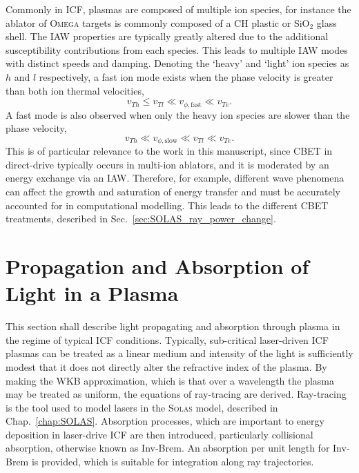 Commonly in \ac{ICF}, plasmas are composed of multiple ion species, for instance the ablator of \textsc{Omega} targets is commonly composed of a CH plastic or SiO$_2$ glass shell.
The \ac{IAW} properties are typically greatly altered due to the additional susceptibility contributions from each species.
This leads to multiple \ac{IAW} modes with distinct speeds and damping.
Denoting the `heavy' and `light' ion species as $h$ and $l$ respectively, a fast ion mode exists when the phase velocity is greater than both ion thermal velocities,
\begin{equation}
    v_{Th} \leq v_{Tl} \ll v_{\phi,\text{fast}} \ll v_{Te}.
\end{equation}
A fast mode is also observed when only the heavy ion species are slower than the phase velocity,
\begin{equation}
    v_{Th} \ll v_{\phi,\text{slow}} \ll v_{Tl}  \ll v_{Te}.
\end{equation}
This is of particular relevance to the work in this manuscript, since \ac{CBET} in direct-drive typically occurs in multi-ion ablators, and it is moderated by an energy exchange via an \ac{IAW}.
Therefore, for example, different wave phenomena can affect the growth and saturation of energy transfer and must be accurately accounted for in computational modelling.
This leads to the different \ac{CBET} treatments, described in Sec.~\ref{sec:SOLAS_ray_power_change}.

\section{Propagation and Absorption of Light in a Plasma}%
\label{sec:theory_propagation}

This section shall describe light propagating and absorption through plasma in the regime of typical \ac{ICF} conditions.
Typically, sub-critical laser-driven \ac{ICF} plasmas can be treated as a linear medium and intensity of the light is sufficiently modest that it does not directly alter the refractive index of the plasma.
By making the WKB approximation, which is that over a wavelength the plasma may be treated as uniform, the equations of ray-tracing are derived.
Ray-tracing is the tool used to model lasers in the \textsc{Solas} model, described in Chap.~\ref{chap:SOLAS}.
Absorption processes, which are important to energy deposition in laser-drive \ac{ICF} are then introduced, particularly collisional absorption, otherwise known as \ac{Inv-Brem}.
An absorption per unit length for \ac{Inv-Brem} is provided, which is suitable for integration along ray trajectories.

